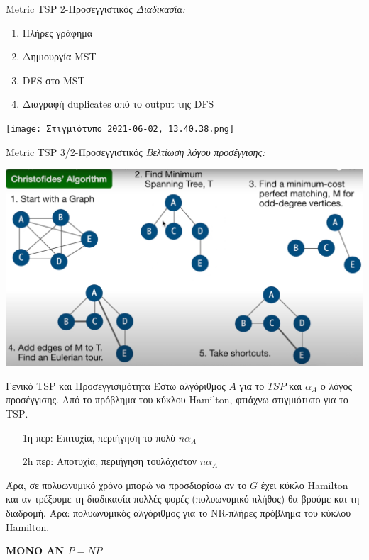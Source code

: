 \documentclass{beamer}
\begin{document}
\begin{frame}{\textlatin{Metric TSP 2-Προσεγγιστικός}}
\emph{Διαδικασία:}
\begin{enumerate}
    \item Πλήρες γράφημα
    \item Δημιουργία \textlatin{MST}
    \item \textlatin{DFS} στο \textlatin{MST}
    \item Διαγραφή \textlatin{duplicates} από το \textlatin{output} της \textlatin{DFS}
\end{enumerate}

\begin{center}
    \texttt{[image: Στιγμιότυπο 2021-06-02, 13.40.38.png]}
\end{center}

\end{frame}


\begin{frame}{\textlatin{Metric TSP} 3/2-Προσεγγιστικός}
    \emph{Βελτίωση λόγου προσέγγισης:}
    \begin{center}
        \includegraphics[width=\textwidth]{rec.jpg}
    \end{center}
\end{frame}

\begin{frame}{Γενικό \textlatin{TSP} και Προσεγγισιμότητα}
    Έστω αλγόριθμος $Α$ για το $TSP$ και $α_Α$ ο λόγος προσέγγισης. Από το πρόβλημα του κύκλου \textlatin{Hamilton}, φτιάχνω στιγμιότυπο για το \textlatin{TSP}.
    \begin{itemize}
        \item [1η περ:] Επιτυχία, περιήγηση το πολύ $n α_A$
        \item [2h περ:] Αποτυχία, περιήγηση τουλάχιστον $n α_A$
    \end{itemize}
    Άρα, σε πολυωνυμικό χρόνο μπορώ να προσδιορίσω αν το $G$ έχει κύκλο \textlatin{Hamilton} και αν τρέξουμε τη διαδικασία πολλές φορές (πολυωνυμικό πλήθος) θα βρούμε και τη διαδρομή. 
    \newline \newline
    Άρα: πολυωνυμικός αλγόριθμος για το NR-πλήρες πρόβλημα του κύκλου \textlatin{Hamilton}. 
    \begin{center}
    \textbf{MONO AN $P = NP$}
    \end{center}
  
\end{frame}
\end{document}
